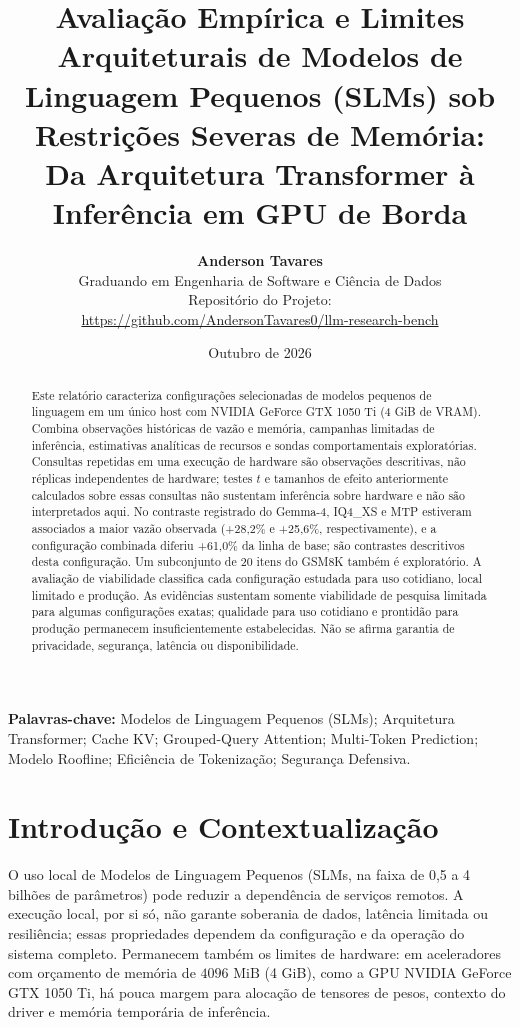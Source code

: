 \documentclass[10pt,a4paper,twocolumn]{article}
\title{\textbf{Avalia\c{c}\~ao Emp\'irica e Limites Arquiteturais de Modelos de Linguagem Pequenos (SLMs) sob Restri\c{c}\~oes Severas de Mem\'oria:\\Da Arquitetura Transformer \`a Infer\^encia em GPU de Borda}}
\author{\textbf{Anderson Tavares}\\\normalsize Graduando em Engenharia de Software e Ci\^encia de Dados\\\normalsize Reposit\'orio do Projeto:\\\url{https://github.com/AndersonTavares0/llm-research-bench}}
\date{Outubro de 2026}
\begin{document}
\maketitle

\begin{abstract}
\noindent Este relatório caracteriza configurações selecionadas de modelos pequenos de linguagem em um único host com NVIDIA GeForce GTX 1050 Ti (4 GiB de VRAM). Combina observações históricas de vazão e memória, campanhas limitadas de inferência, estimativas analíticas de recursos e sondas comportamentais exploratórias. Consultas repetidas em uma execução de hardware são observações descritivas, não réplicas independentes de hardware; testes $t$ e tamanhos de efeito anteriormente calculados sobre essas consultas não sustentam inferência sobre hardware e não são interpretados aqui. No contraste registrado do Gemma-4, IQ4\_XS e MTP estiveram associados a maior vazão observada (+28,2\% e +25,6\%, respectivamente), e a configuração combinada diferiu +61,0\% da linha de base; são contrastes descritivos desta configuração. Um subconjunto de 20 itens do GSM8K também é exploratório. A avaliação de viabilidade classifica cada configuração estudada para uso cotidiano, local limitado e produção. As evidências sustentam somente viabilidade de pesquisa limitada para algumas configurações exatas; qualidade para uso cotidiano e prontidão para produção permanecem insuficientemente estabelecidas. Não se afirma garantia de privacidade, segurança, latência ou disponibilidade.
\end{abstract}

\noindent\textbf{Palavras-chave:} Modelos de Linguagem Pequenos (SLMs); Arquitetura Transformer; Cache KV; Grouped-Query Attention; Multi-Token Prediction; Modelo Roofline; Efici\^encia de Tokeniza\c{c}\~ao; Seguran\c{c}a Defensiva.

\clearpage

\section{Introdu\c{c}\~ao e Contextualiza\c{c}\~ao}

O uso local de Modelos de Linguagem Pequenos (SLMs, na faixa de 0,5 a 4 bilh\~oes de par\^ametros) pode reduzir a depend\^encia de servi\c{c}os remotos. A execu\c{c}\~ao local, por si s\'o, n\~ao garante soberania de dados, lat\^encia limitada ou resili\^encia; essas propriedades dependem da configura\c{c}\~ao e da opera\c{c}\~ao do sistema completo. Permanecem tamb\'em os limites de hardware: em aceleradores com or\c{c}amento de mem\'oria de $4096\text{ MiB}$ (4 GiB), como a GPU NVIDIA GeForce GTX 1050 Ti, h\'a pouca margem para aloca\c{c}\~ao de tensores de pesos, contexto do driver e mem\'oria tempor\'aria de infer\^encia.
\end{document}
